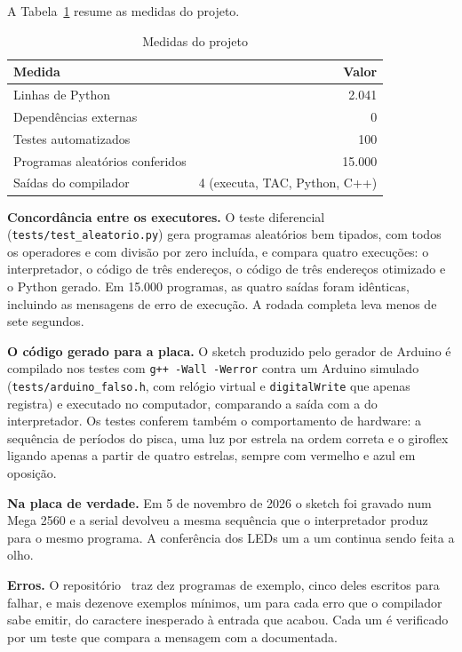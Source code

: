 \documentclass[conference]{IEEEtran}
\begin{document}
A Tabela~\ref{tab:resultados} resume as medidas do projeto.

\begin{table}[htbp]
\caption{Medidas do projeto}
\label{tab:resultados}
\centering
\footnotesize
\begin{tabular}{@{}lr@{}}
\toprule
\textbf{Medida} & \textbf{Valor} \\
\midrule
Linhas de Python & 2.041 \\
Dependências externas & 0 \\
Testes automatizados & 100 \\
Programas aleatórios conferidos & 15.000 \\
Saídas do compilador & 4 (executa, TAC, Python, C++) \\
\bottomrule
\end{tabular}
\end{table}

\textbf{Concordância entre os executores.} O teste diferencial (\texttt{tests/test\_aleatorio.py}) gera programas aleatórios bem tipados, com todos os operadores e com divisão por zero incluída, e compara quatro execuções: o interpretador, o código de três endereços, o código de três endereços otimizado e o Python gerado. Em 15.000 programas, as quatro saídas foram idênticas, incluindo as mensagens de erro de execução. A rodada completa leva menos de sete segundos.

\textbf{O código gerado para a placa.} O sketch produzido pelo gerador de Arduino é compilado nos testes com \texttt{g++ -Wall -Werror} contra um Arduino simulado (\texttt{tests/arduino\_falso.h}, com relógio virtual e \texttt{digitalWrite} que apenas registra) e executado no computador, comparando a saída com a do interpretador. Os testes conferem também o comportamento de hardware: a sequência de períodos do pisca, uma luz por estrela na ordem correta e o giroflex ligando apenas a partir de quatro estrelas, sempre com vermelho e azul em oposição.

\textbf{Na placa de verdade.} Em 5 de novembro de 2026 o sketch foi gravado num Mega 2560 e a serial devolveu a mesma sequência que o interpretador produz para o mesmo programa. A conferência dos LEDs um a um continua sendo feita a olho.

\textbf{Erros.} O repositório~\cite{repo} traz dez programas de exemplo, cinco deles escritos para falhar, e mais dezenove exemplos mínimos, um para cada erro que o compilador sabe emitir, do caractere inesperado à entrada que acabou. Cada um é verificado por um teste que compara a mensagem com a documentada.
\end{document}
